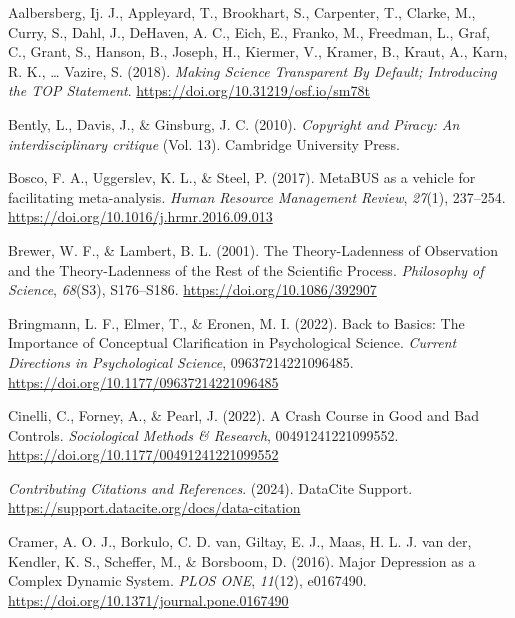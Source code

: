 \documentclass[
  man, noextraspace,floatsintext]{apa7}
\newlength{\cslhangindent}
\newenvironment{CSLReferences}[2] %
 {\begin{list}{}{%
  \setlength{\itemindent}{0pt}
  \setlength{\leftmargin}{0pt}
  \setlength{\parsep}{0pt}
  \ifodd #1
   \setlength{\leftmargin}{\cslhangindent}
   \setlength{\itemindent}{-1\cslhangindent}
  \fi
  \setlength{\itemsep}{#2\baselineskip}}}
 {\end{list}}
\begin{document}
\label{refs}
\begin{CSLReferences}{1}{0}
Aalbersberg, Ij. J., Appleyard, T., Brookhart, S., Carpenter, T., Clarke, M., Curry, S., Dahl, J., DeHaven, A. C., Eich, E., Franko, M., Freedman, L., Graf, C., Grant, S., Hanson, B., Joseph, H., Kiermer, V., Kramer, B., Kraut, A., Karn, R. K., \ldots{} Vazire, S. (2018). \emph{Making {Science Transparent By Default}; {Introducing} the {TOP Statement}}. \url{https://doi.org/10.31219/osf.io/sm78t}

Bently, L., Davis, J., \& Ginsburg, J. C. (2010). \emph{Copyright and {Piracy}: {An} interdisciplinary critique} (Vol. 13). Cambridge University Press.

Bosco, F. A., Uggerslev, K. L., \& Steel, P. (2017). {MetaBUS} as a vehicle for facilitating meta-analysis. \emph{Human Resource Management Review}, \emph{27}(1), 237--254. \url{https://doi.org/10.1016/j.hrmr.2016.09.013}

Brewer, W. F., \& Lambert, B. L. (2001). The {Theory-Ladenness} of {Observation} and the {Theory-Ladenness} of the {Rest} of the {Scientific Process}. \emph{Philosophy of Science}, \emph{68}(S3), S176--S186. \url{https://doi.org/10.1086/392907}

Bringmann, L. F., Elmer, T., \& Eronen, M. I. (2022). Back to {Basics}: {The Importance} of {Conceptual Clarification} in {Psychological Science}. \emph{Current Directions in Psychological Science}, 09637214221096485. \url{https://doi.org/10.1177/09637214221096485}

Cinelli, C., Forney, A., \& Pearl, J. (2022). A {Crash Course} in {Good} and {Bad Controls}. \emph{Sociological Methods \& Research}, 00491241221099552. \url{https://doi.org/10.1177/00491241221099552}

\emph{Contributing {Citations} and {References}}. (2024). DataCite Support. \url{https://support.datacite.org/docs/data-citation}

Cramer, A. O. J., Borkulo, C. D. van, Giltay, E. J., Maas, H. L. J. van der, Kendler, K. S., Scheffer, M., \& Borsboom, D. (2016). Major {Depression} as a {Complex Dynamic System}. \emph{PLOS ONE}, \emph{11}(12), e0167490. \url{https://doi.org/10.1371/journal.pone.0167490}


\end{CSLReferences}
\end{document}
